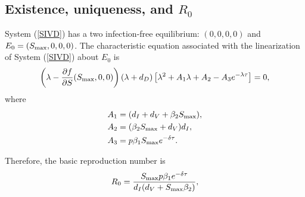 \documentclass{CMHPhD-SIVD}
\begin{document}
\subsection{Existence, uniqueness, and $R_0$}\label{sec3.1}
System (\ref{SIVD}) has a two infection-free equilibrium: $(0,0,0,0)$ and $E_0=(S_{\text{max}},0,0,0)$.
The characteristic equation associated with the linearization of System (\ref{SIVD}) about $E_0$ is
\begin{equation}\label{4}
	\left(\lambda-\frac{\partial f}{\partial S} (S_{\text{max}}, 0, 0)\right)(\lambda+d_D)\left[\lambda^2+A_1\lambda+A_2-A_3e^{-\lambda\tau}\right]=0,
\end{equation}
where
\begin{align*}
&A_1=(d_I+d_V+\beta_2 S_{\text{max}}),\\
&A_2=(\beta_2 S_{\text{max}}+d_V)d_I,\\
&A_3=p\beta_1 S_{\text{max}} e^{-\delta\tau}.
\end{align*}

%
%


Therefore, the basic reproduction number is
\begin{equation}\label{SIVD-Ro}
   R_0=\frac{S_{\text{max}} p \beta_1 e^{-\delta \tau}}{d_{I}(d_{V}+S_{\text{max}} \beta_2)},
\end{equation}
\end{document}
